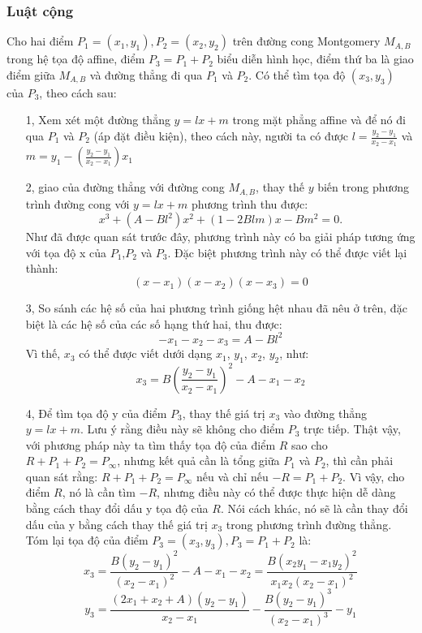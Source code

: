 \documentclass[a4paper,12pt]{report}
\begin{document}
\subsubsection{Luật cộng}
Cho hai điểm $P_{1} = (x_{1}, y_{1}), P_{2}=(x_{2},y_{2})$ trên đường cong Montgomery $M_{A, B}$ trong hệ tọa độ affine, điểm $P_{3} = P_{1} + P_{2}$ biểu diễn hình học, điểm thứ ba là giao điểm giữa $M_{A, B}$ và đường thẳng đi qua $P_{1}$ và $P_{2}$. Có thể tìm tọa độ $(x_3, y_3)$ của $P_{3}$, theo cách sau:
\begin{itemize}
\item[1, ] Xem xét một đường thẳng $y = lx + m$ trong mặt phẳng affine và để nó đi qua $P_{1}$ và $P_{2}$ (áp đặt điều kiện), theo cách này, người ta có được $\displaystyle{l = \frac {y_{2} - y_{1}}{x_{2} - x_{1}}}$ và $\displaystyle{m = y_ {1} - \left({\frac {y_ {2} -y_ {1}} {x_ {2} -x_ {1}}} \right)x_{1}}$
\item[2, ] giao của đường thẳng với đường cong $M_{A, B}$, thay thế $y$ biến trong phương trình đường cong với $y = lx + m$ phương trình thu được:
\begin{displaymath}
x^3 + (A - Bl^2)x^2 + (1 - 2Blm)x - Bm^2 = 0.
\end{displaymath}
Như đã được quan sát trước đây, phương trình này có ba giải pháp tương ứng với tọa độ x của $P_{1}$,$P_{2}$ và $P_{3}$. Đặc biệt phương trình này có thể được viết lại thành:
\begin{displaymath}
(x - x_1)(x - x_2)(x - x_3) = 0
\end{displaymath}
\item[3, ] So sánh các hệ số của hai phương trình giống hệt nhau đã nêu ở trên, đặc biệt là các hệ số của các số hạng thứ hai, thu được:
\begin{displaymath}
-x_1 - x_2 - x_3 = A - Bl^2
\end{displaymath}
Vì thế, $x_3$ có thể được viết dưới dạng $x_{1}$, $y_{1}$, $x_{2}$, $y_{2}$, như:
\begin{displaymath}
x_3 = B\left(\frac{y_2 - y_1}{x_2 - x_1} \right)^2 - A - x_1 - x_2
\end{displaymath}
\item[4, ] Để tìm tọa độ y của điểm $P_{3}$, thay thế giá trị $x_{3}$ vào đường thẳng $y = lx + m$. Lưu ý rằng điều này sẽ không cho điểm $P_{3}$ trực tiếp. Thật vậy, với phương pháp này ta tìm thấy tọa độ của điểm $R$ sao cho $R + P_1 + P_2 = P_\infty$, nhưng  kết quả cần là tổng giữa $P_{1}$ và $P_{2}$, thì cần phải quan sát rằng: $R + P_1 + P_2 = P_\infty$ nếu và chỉ nếu $-R = P_1 + P_2$. Vì vậy, cho điểm $R$, nó là cần tìm $-R$, nhưng điều này có thể được thực hiện dễ dàng bằng cách thay đổi dấu y tọa độ của $R$. Nói cách khác, nó sẽ là cần thay đổi dấu của y bằng cách thay thế giá trị  $x_{3}$ trong phương trình đường thẳng.
Tóm lại tọa độ của điểm $P_3 = (x_3, y_3), P_3 = P_1 + P_2$ là:
\begin{displaymath}
x_3 = \frac{B(y_2-y_1)^2}{(x_2-x_1)^2}-A-x_1-x_2=\frac{B(x_2y_1-x_1y_2)^2}{x_1x_2(x_2-x_1)^2}
\end{displaymath}
\begin{displaymath}
y_3 = \frac{(2x_1+x_2+A)(y_2-y_1)}{x_2-x_1}-\frac{B(y_2-y_1)^3}{(x_2-x_1)^3}-y_1
\end{displaymath}
\end{itemize}
\end{document}
